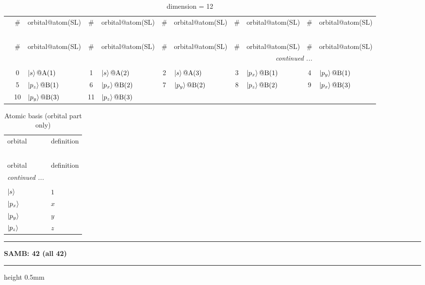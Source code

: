 \documentclass[fleqn,10pt,landscape]{jsarticle}
\begin{document}
\renewcommand{\arraystretch}{1.6}
\begin{longtable}[l]{c|cl|cl|cl|cl|cl}
\captionsetup{justification=raggedright, singlelinecheck=off}
\caption{dimension = 12}
 \\
 \hline \hline
 & \# & orbital@atom(SL) & \# & orbital@atom(SL) & \# & orbital@atom(SL) & \# & orbital@atom(SL) & \# & orbital@atom(SL) \\ \hline \endfirsthead

\multicolumn{10}{l}{\tablename\ \thetable{}} \\
 \hline \hline
 & \# & orbital@atom(SL) & \# & orbital@atom(SL) & \# & orbital@atom(SL) & \# & orbital@atom(SL) & \# & orbital@atom(SL) \\ \hline \endhead

 \hline \hline
\multicolumn{10}{r}{\footnotesize\it continued ...} \\ \endfoot

 \hline \hline
\multicolumn{10}{r}{} \\ \endlastfoot

 & 0 & $\ket{s}@{\rm A}(1)$ & 1 & $\ket{s}@{\rm A}(2)$ & 2 & $\ket{s}@{\rm A}(3)$ & 3 & $\ket{p_{x}}@{\rm B}(1)$ & 4 & $\ket{p_{y}}@{\rm B}(1)$ \\
& 5 & $\ket{p_{z}}@{\rm B}(1)$ & 6 & $\ket{p_{x}}@{\rm B}(2)$ & 7 & $\ket{p_{y}}@{\rm B}(2)$ & 8 & $\ket{p_{z}}@{\rm B}(2)$ & 9 & $\ket{p_{x}}@{\rm B}(3)$ \\
& 10 & $\ket{p_{y}}@{\rm B}(3)$ & 11 & $\ket{p_{z}}@{\rm B}(3)$ &  &  &  &  &  &  \\
\end{longtable}
\renewcommand{\arraystretch}{1.6}
\begin{longtable}[l]{ll}
\captionsetup{justification=raggedright, singlelinecheck=off}
\caption{Atomic basis (orbital part only)}
 \\
 \hline \hline
orbital & definition \\ \hline \endfirsthead

\multicolumn{1}{l}{\tablename\ \thetable{}} \\
 \hline \hline
orbital & definition \\ \hline \endhead

 \hline \hline
\multicolumn{1}{r}{\footnotesize\it continued ...} \\ \endfoot

 \hline \hline
\multicolumn{1}{r}{} \\ \endlastfoot

$ \ket{s} $ & $ 1 $ \\ \hline
$ \ket{p_{x}} $ & $ x $ \\
$ \ket{p_{y}} $ & $ y $ \\
$ \ket{p_{z}} $ & $ z $ \\
\end{longtable}
\vspace{5mm}
\noindent \rule[0.5mm]{5mm}{0.5mm}\hspace{3mm}\textbf{SAMB: 42 (all 42)}\hspace{3mm}\leaders\hrule height 0.5mm\hfill\kern0pt
\vspace{3mm}
\end{document}
